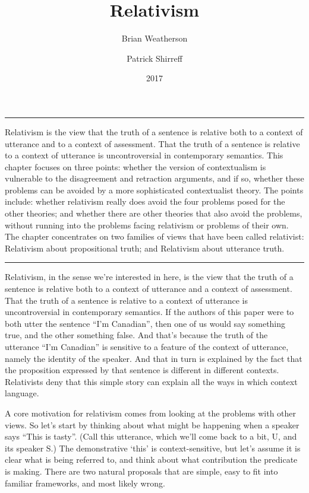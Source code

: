 \documentclass[
  10pt,
  letterpaper,
  DIV=11,
  numbers=noendperiod,
  twoside]{scrartcl}
\title{Relativism}
\author{Brian Weatherson \and Patrick Shirreff}
\date{2017}
\renewenvironment{abstract}
 {\vspace{-1.25cm}
 \quotation\small\noindent\rule{\linewidth}{.5pt}\par\smallskip
 \noindent }
 {\par\noindent\rule{\linewidth}{.5pt}\endquotation}
\begin{document}
\maketitle
\begin{abstract}
Relativism is the view that the truth of a sentence is relative both to
a context of utterance and to a context of assessment. That the truth of
a sentence is relative to a context of utterance is uncontroversial in
contemporary semantics. This chapter focuses on three points: whether
the version of contextualism is vulnerable to the disagreement and
retraction arguments, and if so, whether these problems can be avoided
by a more sophisticated contextualist theory. The points include:
whether relativism really does avoid the four problems posed for the
other theories; and whether there are other theories that also avoid the
problems, without running into the problems facing relativism or
problems of their own. The chapter concentrates on two families of views
that have been called relativist: Relativism about propositional truth;
and Relativism about utterance truth.
\end{abstract}

Relativism, in the sense we're interested in here, is the view that the
truth of a sentence is relative both to a context of utterance and a
context of assessment. That the truth of a sentence is relative to a
context of utterance is uncontroversial in contemporary semantics. If
the authors of this paper were to both utter the sentence ``I'm
Canadian'', then one of us would say something true, and the other
something false. And that's because the truth of the utterance ``I'm
Canadian'' is sensitive to a feature of the context of utterance, namely
the identity of the speaker. And that in turn is explained by the fact
that the proposition expressed by that sentence is different in
different contexts. Relativists deny that this simple story can explain
all the ways in which context language.

A core motivation for relativism comes from looking at the problems with
other views. So let's start by thinking about what might be happening
when a speaker says ``This is tasty''. (Call this utterance, which we'll
come back to a bit, U, and its speaker S.) The demonstrative `this' is
context-sensitive, but let's assume it is clear what is being referred
to, and think about what contribution the predicate is making. There are
two natural proposals that are simple, easy to fit into familiar
frameworks, and most likely wrong.
\end{document}
